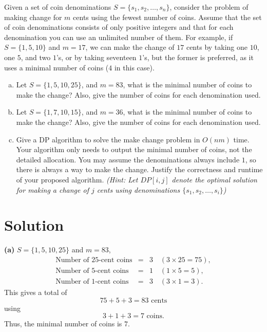\documentclass[11pt]{article}
\begin{document}
    \begin{tcolorbox}[title={Problem 2 (Make Change, 50 points)}] \setlength\parindent{1em}
        
     Given a set of coin denominations $S=\{s_1, s_2,\dots, s_n\}$, consider the problem of making change for $m$ cents using the fewest
        number of coins. Assume that the set of coin denominations consists of only positive integers and that for each denomination you can use an unlimited number of them. For example, if $S=\{1, 5, 10\}$ and $m=17$, we can make the change of $17$ cents by taking one $10$, one $5$, and two $1$'s, or by taking seventeen $1$'s, but the former is preferred, as it uses a minimal number of coins ($4$ in this case).

    \begin{enumerate}[(a)]
    \item Let $S=\{1, 5, 10, 25\}$, and $m=83$, what is the minimal number of coins to make the change? Also, give the number of coins for each denomination used.
    \item Let $S=\{1, 7, 10, 15\}$, and $m=36$, what is the minimal number of coins to make the change? Also, give the number of coins for each denomination used.
    \item Give a DP algorithm to solve the make change problem in $O(nm)$ time. Your algorithm only needs to output the minimal number of coins, not the detailed allocation. You may assume the denominations always include $1$, so there is always a way to make the change. Justify the correctness and runtime of your proposed algorithm. \textit{(Hint: Let $DP[i,j]$ denote the optimal solution for making a change of $j$ cents using denominations $\{s_1, s_2, \dots, s_i\}$)}
    \end{enumerate}
    \end{tcolorbox}
    
    \section*{Solution}
    \textbf{(a)} \(S=\{1, 5, 10, 25\}\) and \(m=83\),
    \[
    \begin{array}{rcl}
    \text{Number of 25-cent coins} &=& 3 \quad (3\times25=75),\\[1mm]
    \text{Number of 5-cent coins}  &=& 1 \quad (1\times5=5),\\[1mm]
    \text{Number of 1-cent coins}  &=& 3 \quad (3\times1=3).
    \end{array}
    \]
    This gives a total of 
    \[
    75+5+3=83 \text{ cents}
    \]
    using 
    \[
    3+1+3=7 \text{ coins}.
    \]
    Thus, the minimal number of coins is \(\boxed{7}\).
    
\end{document}
